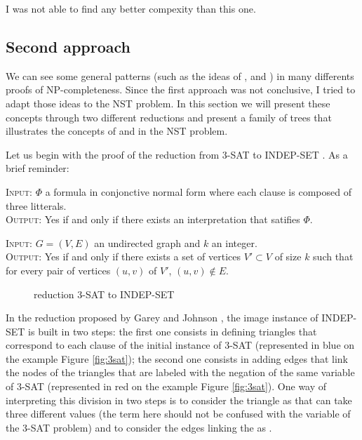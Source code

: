 I was not able to find any better compexity than this one. 

\subsection{Second approach}
We can see some general patterns (such as the ideas of \variables, \widgets and
\constraints) in many differents proofs of NP-completeness. Since the
first approach was not conclusive, I tried to adapt those ideas to the
NST problem. In this section we will present these concepts through
two different reductions and present a family of trees that
illustrates the concepts of \variables and \widgets in the NST problem.

Let us begin with the proof of the reduction from 3-SAT to INDEP-SET
\cite{polytech}. As a brief reminder:

\begin{definition}[3-SAT]
\textsc{Input:} $\Phi$ a formula in conjonctive normal form where each
clause is composed of three litterals. \\
\textsc{Output:} Yes if and only if there exists an interpretation
that satifies $\Phi$.\\
\end{definition}

\begin{definition} 
\textsc{Input:} $G=(V,E)$ an undirected graph and $k$ an integer.\\
\textsc{Output:} Yes if and only if there exists a set of vertices
$V' \subset V$ of size $k$ such that for every pair of vertices
$(u,v)$ of $V'$, $(u,v) \notin E$.\\
\end{definition}

\begin{figure}
  \centering
  
  \caption{reduction 3-SAT to INDEP-SET}
  \label{fig:indep-set}
\end{figure}

In the reduction proposed by Garey and Johnson \cite{garey}, the image
instance of INDEP-SET is built in two steps: the first one consists in
defining triangles that correspond to each clause of the initial
instance of 3-SAT (represented in blue on the example Figure
\ref{fig:3sat}); the second one consists in adding edges that link the
nodes of the triangles that are labeled with the negation of the same
variable of 3-SAT (represented in red on the example Figure
\ref{fig:3sat}). One way of interpreting this division in two steps is
to consider the triangle \widgets as \variables that can take three
different values (the \variable term here should not be confused with
the variable of the 3-SAT problem) and to consider the edges linking
the \widgets as \constraints.

